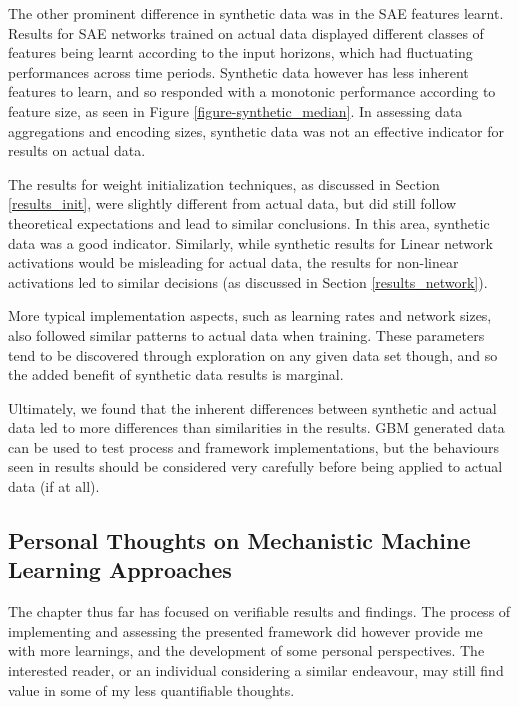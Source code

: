 \documentclass[a4paper,11pt,oneside]{article}
\theoremstyle{plain}
\theoremstyle{definition}
\begin{document}
	The other prominent difference in synthetic data was in the SAE features learnt. Results for SAE networks trained on actual data displayed different classes of features being learnt according to the input horizons, which had fluctuating performances across time periods. Synthetic data however has less inherent features to learn, and so responded with a monotonic performance according to feature size, as seen in Figure \ref{figure-synthetic_median}. In assessing data aggregations and encoding sizes, synthetic data was not an effective indicator for results on actual data. \newline

	The results for weight initialization techniques, as discussed in Section \ref{results_init}, were slightly different from actual data, but did still follow theoretical expectations and lead to similar conclusions. In this area, synthetic data was a good indicator. Similarly, while synthetic results for Linear network activations would be misleading for actual data, the results for non-linear activations led to similar decisions (as discussed in Section \ref{results_network}).\newline
	
	More typical implementation aspects, such as learning rates and network sizes, also followed similar patterns to actual data when training. These parameters tend to be discovered through exploration on any given data set though, and so the added benefit of synthetic data results is marginal.\newline
	
	Ultimately, we found that the inherent differences between synthetic and actual data led to more differences than similarities in the results. GBM generated data can be used to test process and framework implementations, but the behaviours seen in results should be considered very carefully before being applied to actual data (if at all).
	
	\newpage
	\subsection{Personal Thoughts on Mechanistic Machine Learning Approaches}\label{results_personal}
	
	The chapter thus far has focused on verifiable results and findings. The process of implementing and assessing the presented framework did however provide me with more learnings, and the development of some personal perspectives. The interested reader, or an individual considering a similar endeavour, may still find value in some of my less quantifiable thoughts. 
	
\end{document}
